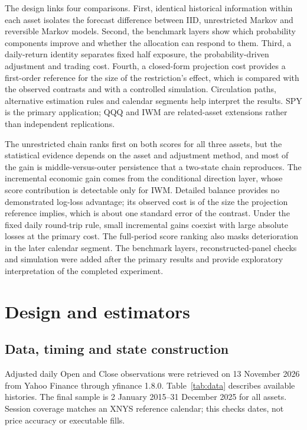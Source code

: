 The design links four comparisons. First, identical historical information within each asset isolates the forecast difference between IID, unrestricted Markov and reversible Markov models. Second, the benchmark layers show which probability components improve and whether the allocation can respond to them. Third, a daily-return identity separates fixed half exposure, the probability-driven adjustment and trading cost. Fourth, a closed-form projection cost provides a first-order reference for the size of the restriction's effect, which is compared with the observed contrasts and with a controlled simulation. Circulation paths, alternative estimation rules and calendar segments help interpret the results. SPY is the primary application; QQQ and IWM are related-asset extensions rather than independent replications.

The unrestricted chain ranks first on both scores for all three assets, but the statistical evidence depends on the asset and adjustment method, and most of the gain is middle-versus-outer persistence that a two-state chain reproduces. The incremental economic gain comes from the conditional direction layer, whose score contribution is detectable only for IWM. Detailed balance provides no demonstrated log-loss advantage; its observed cost is of the size the projection reference implies, which is about one standard error of the contrast. Under the fixed daily round-trip rule, small incremental gains coexist with large absolute losses at the primary cost. The full-period score ranking also masks deterioration in the later calendar segment. The benchmark layers, reconstructed-panel checks and simulation were added after the primary results and provide exploratory interpretation of the completed experiment.

\section{Design and estimators}\label{sec:design}
\subsection{Data, timing and state construction}
Adjusted daily Open and Close observations were retrieved on 13 November 2026 from Yahoo Finance through yfinance 1.8.0. Table~\ref{tab:data} describes available histories. The final sample is 2 January 2015--31 December 2025 for all assets. Session coverage matches an XNYS reference calendar; this checks dates, not price accuracy or executable fills.

